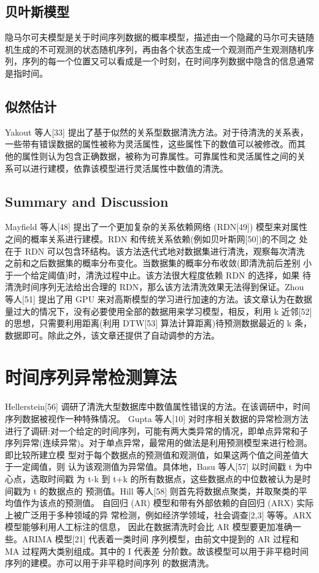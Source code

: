\documentclass{article}
\begin{document}
\subsection{贝叶斯模型}
隐马尔可夫模型是关于时间序列数据的概率模型，描述由一个隐藏的马尔可夫链随机生成的不可观测的状态随机序列，再由各个状态生成一个观测而产生观测随机序列，序列的每一个位置又可以看成是一个时刻，在时间序列数据中隐含的信息通常是指时间。
\subsection{似然估计}
Yakout 等人[33] 提出了基于似然的关系型数据清洗方法。对于待清洗的关系表， 一些带有错误数据的属性被称为灵活属性，这些属性下的数值可以被修改。而其 他的属性则认为包含正确数据，被称为可靠属性。可靠属性和灵活属性之间的关 系可以进行建模，依靠该模型进行灵活属性中数值的清洗。


\subsection{Summary and Discussion}
Mayfield 等人[48] 提出了一个更加复杂的关系依赖网络 (RDN[49]) 模型来对属性之间的概率关系进行建模。RDN 和传统关系依赖(例如贝叶斯网[50])的不同之 处在于 RDN 可以包含环结构。该方法迭代式地对数据集进行清洗，观察每次清洗 之前和之后数据集的概率分布变化。当数据集的概率分布收敛(即清洗前后差别 小于一个给定阈值)时，清洗过程中止。该方法很大程度依赖 RDN 的选择，如果 待清洗时间序列无法给出合理的 RDN，那么该方法清洗效果无法得到保证。Zhou 等人[51] 提出了用 GPU 来对高斯模型的学习进行加速的方法。该文章认为在数据 量过大的情况下，没有必要使用全部的数据用来学习模型，相反，利用 k 近邻[52] 的思想，只需要利用距离(利用 DTW[53] 算法计算距离)待预测数据最近的 k 条，数据即可。除此之外，该文章还提供了自动调参的方法。

\section{时间序列异常检测算法}
Hellerstein[56] 调研了清洗大型数据库中数值属性错误的方法。在该调研中，时间序列数据被视作一种特殊情况。 Gupta 等人[10] 对时序相关数据的异常检测方法进行了调研:对一个给定的时间序列，可能有两大类异常的情况，即单点异常和子序列异常(连续异常)。对于单点异常，最常用的做法是利用预测模型来进行检测。即比较所建立模 型对于每个数据点的预测值和观测值，如果这两个值之间差值大于一定阈值，则 认为该观测值为异常值。具体地，Basu 等人[57] 以时间戳 t 为中心点，选取时间戳 为 t-k 到 t+k 的所有数据点，这些数据点的中位数被认为是时间戳为 t 的数据点的 预测值。Hill 等人[58] 则首先将数据点聚类，并取聚类的平均值作为该点的预测值。 自回归 (AR) 模型和带有外部依赖的自回归 (ARX) 实际上被广泛用于多种领域的异 常检测，例如经济学领域，社会调查[2,3] 等等。ARX 模型能够利用人工标注的信息， 因此在数据清洗时会比 AR 模型要更加准确一些。ARIMA 模型[21] 代表着一类时间 序列模型，由前文中提到的 AR 过程和 MA 过程两大类别组成。其中的 I 代表差 分阶数。故该模型可以用于非平稳时间序列的建模。亦可以用于非平稳时间序列 的数据清洗。 
\end{document}
